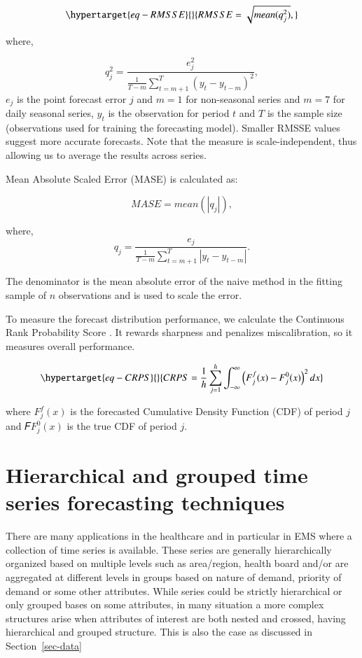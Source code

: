 \documentclass[
  authoryear,
  preprint,
  3p]{elsarticle}
\begin{document}
\begin{equation}\protect\hypertarget{eq-RMSSE}{}{
RMSSE = \sqrt{mean(q_{j}^2)},
}\label{eq-RMSSE}\end{equation}

where,

\[
q^2_{j} = \frac{ e^2_{j}}
    {\frac{1}{T-m}\sum_{t=m+1}^T (y_{t}-y_{t-m})^2},
\] \(e_{j}\) is the point forecast error \(j\) and \(m = 1\) for
non-seasonal series and \(m = 7\) for daily seasonal series, \(y_t\) is
the observation for period \(t\) and \(T\) is the sample size
(observations used for training the forecasting model). Smaller RMSSE
values suggest more accurate forecasts. Note that the measure is
scale-independent, thus allowing us to average the results across
series.

Mean Absolute Scaled Error (MASE) is calculated as:

\[
MASE = mean(|q_{j}|),
\]

where, \[
q_{j} = \frac{ e_{j}}
    {\frac{1}{T-m}\sum_{t=m+1}^T |y_{t}-y_{t-m}|}.
\]

The denominator is the mean absolute error of the naive method in the
fitting sample of \(n\) observations and is used to scale the error.

To measure the forecast distribution performance, we calculate the
Continuous Rank Probability Score \citep{gneiting2014probabilistic}. It
rewards sharpness and penalizes miscalibration, so it measures overall
performance.

\begin{equation}\protect\hypertarget{eq-CRPS}{}{
CRPS=\frac{1}{h} \sum_{j=1}^{h} \int_{-\infty}^{\infty} \left(F^f_j(x) - F^0_j(x)\right)^2dx
}\label{eq-CRPS}\end{equation}

where \(F^f_j(x)\) is the forecasted Cumulative Density Function (CDF)
of period \(j\) and 𝐹\(F^0_j(x)\) is the true CDF of period \(j\).

\hypertarget{sec-htc}{%
\section{Hierarchical and grouped time series forecasting
techniques}\label{sec-htc}}

There are many applications in the healthcare and in particular in EMS
where a collection of time series is available. These series are
generally hierarchically organized based on multiple levels such as
area/region, health board and/or are aggregated at different levels in
groups based on nature of demand, priority of demand or some other
attributes. While series could be strictly hierarchical or only grouped
bases on some attributes, in many situation a more complex structures
arise when attributes of interest are both nested and crossed, having
hierarchical and grouped structure. This is also the case as discussed
in Section~\ref{sec-data}
\end{document}
